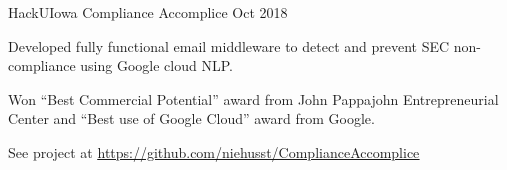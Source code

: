 \documentclass[12pt, a4paper]{awesome-cv}
\begin{document}


\begin{cventries}

    \cventry
	{HackUIowa}
 	{Compliance Accomplice}
	{Oct 2018}
	{}
	{
	  \begin{cvitems}
	     \item{Developed fully functional email middleware to detect and prevent SEC non-compliance using Google cloud NLP.}
	     \item{Won “Best Commercial Potential” award from John Pappajohn Entrepreneurial Center and “Best use of Google Cloud” award from Google.}
	     \item{See project at \underline{\href{https://github.com/niehusst/ComplianceAccomplice}{https://github.com/niehusst/ComplianceAccomplice}}} 
	  \end{cvitems}
	}
\end{cventries}
\end{document}

